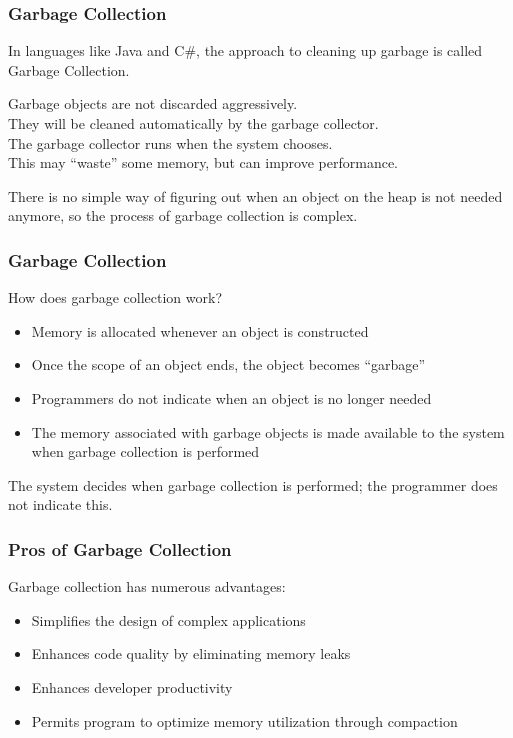 \begin{frame}
\frametitle{Garbage Collection}

In languages like Java and C\#, the approach to cleaning up garbage is called \alert{Garbage Collection}.

Garbage objects are not discarded aggressively.\\
\quad They will be cleaned automatically by the garbage collector.\\
\quad The garbage collector runs when the system chooses.\\
\quad This may ``waste'' some memory, but can improve performance.

There is no simple way of figuring out when an object on the heap is not needed anymore, so the process of garbage collection is complex.

\end{frame}

\begin{frame}
\frametitle{Garbage Collection}

How does garbage collection work?
\begin{itemize}
\item Memory is allocated whenever an object is constructed
\item Once the scope of an object ends, the object becomes ``garbage''
\item Programmers do not indicate when an object is no longer needed
\item The memory associated with garbage objects is made available to the system when garbage collection is performed
\end{itemize}

The system decides when garbage collection is performed; the programmer does not indicate this. 

\end{frame}


\begin{frame}
\frametitle{Pros of Garbage Collection}
Garbage collection has numerous advantages:

\begin{itemize}
	\item Simplifies the design of complex applications
	\item Enhances code quality by eliminating memory leaks
	\item Enhances developer productivity
	\item Permits program to optimize memory utilization through compaction
\end{itemize}
\end{frame}

